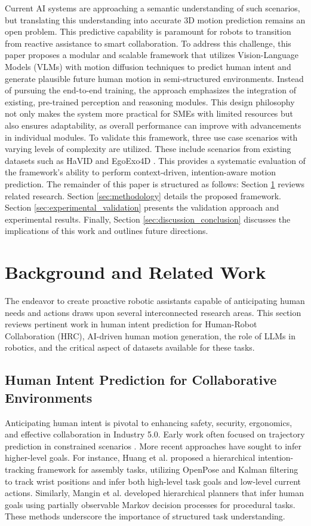 \documentclass[biomimetics,article,submit,pdftex,moreauthors]{Definitions/mdpi}
\begin{document}
Current AI systems are approaching a semantic understanding of such scenarios, but translating this understanding into accurate 3D motion prediction remains an open problem. This predictive capability is paramount for robots to transition from reactive assistance to smart collaboration. To address this challenge, this paper proposes a modular and scalable framework that utilizes Vision-Language Models (VLMs) with motion diffusion techniques to predict human intent and generate plausible future human motion in semi-structured environments. Instead of pursuing the end-to-end training, the approach emphasizes the integration of existing, pre-trained perception and reasoning modules. This design philosophy not only makes the system more practical for SMEs with limited resources but also ensures adaptability, as overall performance can improve with advancements in individual modules. To validate this framework, three use case scenarios with varying levels of complexity are utilized. These include scenarios from existing datasets such as HaVID \citep{havid} and EgoExo4D \citep{egoexo}. This provides a systematic evaluation of the framework's ability to perform context-driven, intention-aware motion prediction. The remainder of this paper is structured as follows: Section \ref{sec:related_work} reviews related research. Section \ref{sec:methodology} details the proposed framework. Section \ref{sec:experimental_validation} presents the validation approach and experimental results. Finally, Section \ref{sec:discussion_conclusion} discusses the implications of this work and outlines future directions.

\section{Background and Related Work} \label{sec:related_work}

The endeavor to create proactive robotic assistants capable of anticipating human needs and actions draws upon several interconnected research areas.
This section reviews pertinent work in human intent prediction for Human-Robot Collaboration (HRC), AI-driven human motion generation, the role of LLMs in robotics, and the critical aspect of datasets available for these tasks.
\subsection{Human Intent Prediction for Collaborative Environments}
Anticipating human intent is pivotal to enhancing safety, security, ergonomics, and effective collaboration in Industry 5.0. Early work often focused on trajectory prediction in constrained scenarios \citep{Huang2021}. More recent approaches have sought to infer higher-level goals.
For instance, Huang et al. \citep{Huang2022} proposed a hierarchical intention-tracking framework for assembly tasks, utilizing OpenPose and Kalman filtering to track wrist positions and infer both high-level task goals and low-level current actions.
Similarly, Mangin et al. \citep{Mangin2022} developed hierarchical planners that infer human goals using partially observable Markov decision processes for procedural tasks.
These methods underscore the importance of structured task understanding.
\end{document}
